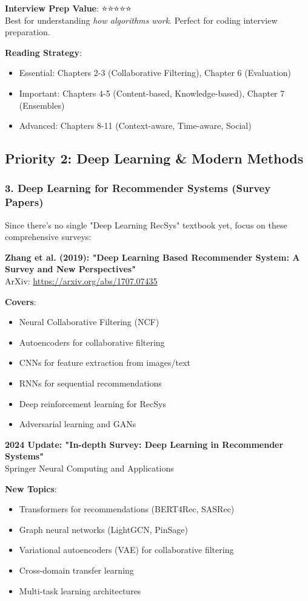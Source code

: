 \documentclass[10pt]{article}
\begin{document}
\textbf{Interview Prep Value}: ⭐⭐⭐⭐⭐ \\
Best for understanding \textit{how algorithms work}. Perfect for coding interview preparation.

\textbf{Reading Strategy}:
\begin{itemize}[leftmargin=*]
    \item Essential: Chapters 2-3 (Collaborative Filtering), Chapter 6 (Evaluation)
    \item Important: Chapters 4-5 (Content-based, Knowledge-based), Chapter 7 (Ensembles)
    \item Advanced: Chapters 8-11 (Context-aware, Time-aware, Social)
\end{itemize}

\subsection{Priority 2: Deep Learning \& Modern Methods}

\subsubsection*{3. Deep Learning for Recommender Systems (Survey Papers)}

Since there's no single "Deep Learning RecSys" textbook yet, focus on these comprehensive surveys:

\textbf{Zhang et al. (2019): "Deep Learning Based Recommender System: A Survey and New Perspectives"} \\
ArXiv: \url{https://arxiv.org/abs/1707.07435}

\textbf{Covers}:
\begin{itemize}[leftmargin=*]
    \item Neural Collaborative Filtering (NCF)
    \item Autoencoders for collaborative filtering
    \item CNNs for feature extraction from images/text
    \item RNNs for sequential recommendations
    \item Deep reinforcement learning for RecSys
    \item Adversarial learning and GANs
\end{itemize}

\textbf{2024 Update: "In-depth Survey: Deep Learning in Recommender Systems"} \\
Springer Neural Computing and Applications

\textbf{New Topics}:
\begin{itemize}[leftmargin=*]
    \item Transformers for recommendations (BERT4Rec, SASRec)
    \item Graph neural networks (LightGCN, PinSage)
    \item Variational autoencoders (VAE) for collaborative filtering
    \item Cross-domain transfer learning
    \item Multi-task learning architectures
\end{itemize}
\end{document}
